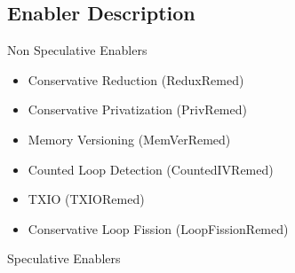 \subsection{Enabler Description}

Non Speculative Enablers

\begin{itemize}
    \item Conservative Reduction (ReduxRemed)

    \item Conservative Privatization (PrivRemed)

    \item Memory Versioning (MemVerRemed)

    \item Counted Loop Detection (CountedIVRemed)

    \item TXIO (TXIORemed)

    \item Conservative Loop Fission (LoopFissionRemed)
\end{itemize}

Speculative Enablers

